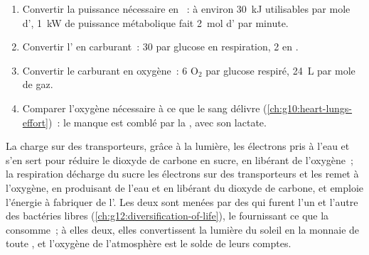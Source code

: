 \begin{method}\label{met:g12:respiration-fermentation:budget}
\begin{enumerate}
  \item Convertir la puissance nécessaire en ~: à environ
        \qty{30}{kJ} utilisables par mole d', \qty{1}{kW} de
        puissance métabolique fait \qty{2}{mol} d' par minute.
  \item Convertir l' en carburant~: 30  par glucose en
        respiration, 2 en .
  \item Convertir le carburant en oxygène~: 6 $\mathrm{O_2}$ par
        glucose respiré, \qty{24}{L} par mole de gaz.
  \item Comparer l'oxygène nécessaire à ce que le sang délivre
        (\cref{ch:g10:heart-lungs-effort})~: le manque est comblé par
        la , avec son lactate.
\end{enumerate}
\end{method}

\begin{remark}\label{rem:g12:respiration-fermentation:mirror}
La  charge sur des transporteurs, grâce à la lumière, les
électrons pris à l'eau et s'en sert pour réduire le dioxyde de carbone
en sucre, en libérant de l'oxygène~; la respiration décharge du sucre
les électrons sur des transporteurs et les remet à l'oxygène, en
produisant de l'eau et en libérant du dioxyde de carbone, et emploie
l'énergie à fabriquer de l'. Les deux sont menées par des 
qui furent l'un et l'autre des bactéries libres
(\cref{ch:g12:diversification-of-life}), le  fournissant
ce que la  consomme~; à elles deux, elles convertissent la
lumière du soleil en la monnaie de toute , et l'oxygène de
l'atmosphère est le solde de leurs comptes.
\end{remark}

